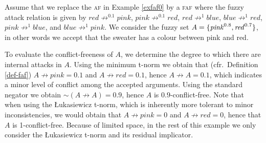 \documentclass[12pt,a4paper]{article}
\newcommand{\abfaf}{\textsc{faf}}
\newcommand{\attack}{\ensuremath{\not\rightarrow}}
\newcommand{\abaf}{\textsc{af}}
\newcommand{\fneg}{\ensuremath{\sim}}
\begin{document}
\begin{example}\label{ex-sweater}
Assume that we replace the \abaf{} in Example \ref{exfaf0} by a \abfaf{} where the fuzzy attack relation is given by
$\mathit{red}\attack^{0.1}\mathit{pink}$,
$\mathit{pink}\attack^{0.1}\mathit{red}$,
$\mathit{red}\attack^1\mathit{blue}$,
$\mathit{blue}\attack^1\mathit{red}$,
$\mathit{pink}\attack^1\mathit{blue} $, and
$\mathit{blue}\attack^1\mathit{pink}$.
We consider the fuzzy set $A = {\{ \mathit{pink}^{0.8}, \mathit{red}^{0.7} \}}$, in other words we accept that the sweater has a colour between pink and red. 

To evaluate the conflict-freeness of $A$, we determine the degree to which there are internal attacks in $A$. Using the minimum t-norm we obtain that (cfr.~Definition \ref{def-faf}) $A \attack pink = 0.1$ and $A \attack red = 0.1$, hence $A \attack A = 0.1$, which indicates a minor level of conflict among the accepted arguments. Using the standard negator we obtain $\fneg (A \attack A) = 0.9$, hence $A$ is $0.9$-conflict-free. Note that when using the {\L}ukasiewicz t-norm, which is inherently more tolerant to minor inconsistencies, we would obtain that $A \attack pink = 0$ and $A \attack red = 0$, hence that $A$ is 1-conflict-free. Because of limited space, in the rest of this example we only consider the {\L}ukasiewicz t-norm and its residual implicator.


\end{example}
\end{document}
